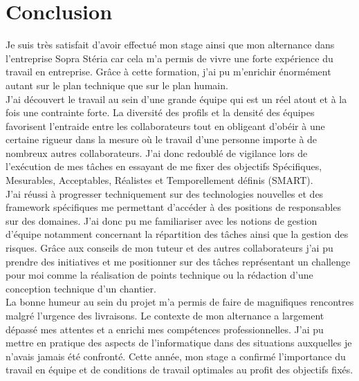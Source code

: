 \documentclass[12pt,a4paper]{article}
\begin{document}
\section{Conclusion}
Je suis très satisfait d’avoir effectué mon stage ainsi que mon alternance dans l'entreprise Sopra Stéria car cela m’a permis de vivre une forte expérience du travail en entreprise. Grâce à cette formation, j’ai pu m’enrichir énormément autant sur le plan technique que sur le plan humain.\\
J’ai découvert le travail au sein d'une grande équipe qui est un réel atout et à la fois une contrainte forte. La diversité des profils et la densité des équipes favorisent l'entraide entre les collaborateurs tout en obligeant d'obéir à une certaine rigueur dans la mesure où le travail d'une personne importe à de nombreux autres collaborateurs. J’ai donc redoublé de vigilance lors de l’exécution de mes tâches en essayant de me fixer des objectifs Spécifiques, Mesurables, Acceptables, Réalistes et Temporellement définis (SMART).\\
J'ai réussi à progresser techniquement sur des technologies nouvelles et des framework spécifiques me permettant d'accéder à des positions de responsables sur des domaines. J'ai donc pu me familiariser avec les notions de gestion d'équipe notamment concernant la répartition des tâches ainsi que la gestion des risques. Grâce aux conseils de mon tuteur et des autres collaborateurs j'ai pu prendre des initiatives et me positionner sur des tâches représentant un challenge pour moi comme la réalisation de points technique ou la rédaction d'une conception technique d'un chantier. \\
La bonne humeur au sein du projet m'a permis de faire de magnifiques rencontres malgré l’urgence des livraisons. Le contexte de mon alternance a largement dépassé mes attentes et a enrichi mes compétences professionnelles. J'ai pu mettre en pratique des aspects de l'informatique dans des situations auxquelles je n'avais jamais été confronté.
Cette année, mon stage a confirmé l'importance du travail en équipe et de conditions de travail optimales au profit des objectifs fixés.
\newpage
\end{document}
